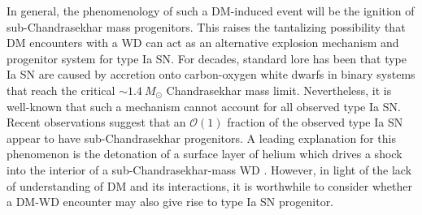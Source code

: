 \documentclass[twocolumn, preprintnumbers,amsmath,amssymb,prd, superscriptaddress]{revtex4}
\newcommand{\OO}{\mathcal{O}}
\begin{document}
In general, the phenomenology of such a DM-induced event will be the ignition of sub-Chandrasekhar mass progenitors.
This raises the tantalizing possibility that DM encounters with a WD can act as an alternative explosion mechanism and progenitor system for type Ia SN.
For decades, standard lore has been that type Ia SN are caused by accretion onto carbon-oxygen white dwarfs in binary systems that reach the critical $\sim 1.4 ~M_{\odot}$ Chandrasekhar mass limit.
Nevertheless, it is well-known that such a mechanism cannot account for all observed type Ia SN.
Recent observations \cite{Scalzo:2014sap, Scalzo:2014wxa} suggest that an $\OO(1)$ fraction of the observed type Ia SN appear to have sub-Chandrasekhar progenitors.
A leading explanation for this phenomenon is the detonation of a surface layer of helium which drives a shock into the interior of a sub-Chandrasekhar-mass WD \cite{Woosley1994,Fink:2007fv}.
However, in light of the lack of understanding of DM and its interactions, it is worthwhile to consider whether a DM-WD encounter may also give rise to type Ia SN progenitor.
\end{document}
